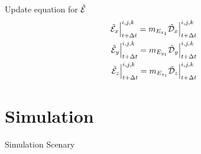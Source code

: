 \documentclass{beamer}
\begin{document}
\begin{frame}{Update equation for $\tilde{\mathcal{E}}$}
  \begin{align}
    \tilde{\mathcal{E}}_x\Big|^{i,j,k}_{t+\Delta t} = m_{E_{x_1}} \tilde{\mathcal{D}}_x\Big|^{i,j,k}_{t+\Delta t} \\
    \tilde{\mathcal{E}}_y\Big|^{i,j,k}_{t+\Delta t} = m_{E_{y_1}} \tilde{\mathcal{D}}_y\Big|^{i,j,k}_{t+\Delta t} \\
    \tilde{\mathcal{E}}_z\Big|^{i,j,k}_{t+\Delta t} = m_{E_{z_1}} \tilde{\mathcal{D}}_z\Big|^{i,j,k}_{t+\Delta t}
\end{align}
\end{frame}

\section{Simulation}
\begin{frame}{Simulation Scenary}
    \centering
      \resizebox{!}{0.5\textheight}
      {
        \centering
        
      }

      \resizebox{0.8\textwidth}{!}
      { 
        
        
      }
\end{frame}
\end{document}
